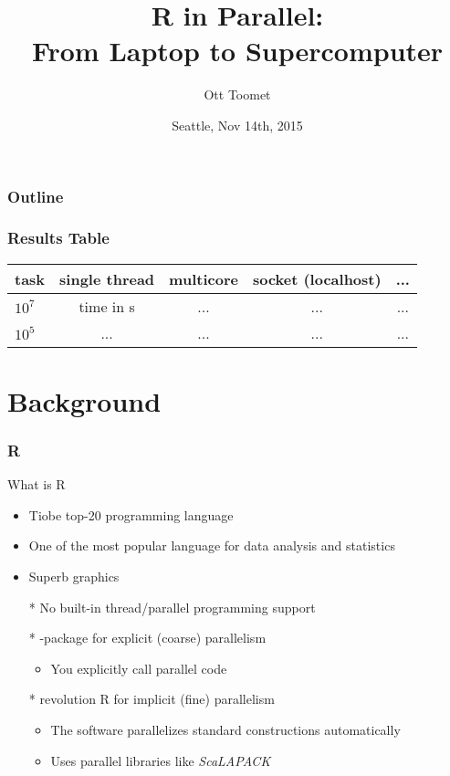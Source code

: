 \documentclass[pdftex]{beamer}
\title[parallel R]{R in Parallel:\\
  From Laptop to Supercomputer}
\author{Ott Toomet}
\date{Seattle, Nov 14th, 2015}
\newcommand{\R}{\textsf{R}\xspace}
\begin{document}
\begin{frame}
  \titlepage
\end{frame}

\begin{frame}
  \frametitle{Outline}
  \tableofcontents
\end{frame}

\begin{frame}
  \frametitle{Results Table}
  \begin{tabular}{l cccc}
    \toprule
    task      & single thread & multicore & socket (localhost) & ... \\
    \midrule
    $10^{7}$  & time in s     & ...       & ...                & ...\\
    $10^{5}$  & ...           & ...       & ...                & ...\\
    \bottomrule
  \end{tabular}
  
\end{frame}

\section{Background}

\begin{frame}
  \frametitle{\R}
  What is \R
  \begin{itemize}
  \item Tiobe top-20 programming language
  \item One of the most popular language for data analysis and statistics
  \item Superb graphics
    \pause
  \item[*] No built-in thread/parallel programming support
  \item[*] -package for explicit (coarse) parallelism
    \begin{itemize}
    \item You explicitly call parallel code
    \end{itemize}
  \item[*] revolution R for implicit (fine) parallelism
    \begin{itemize}
    \item The software parallelizes standard constructions
      automatically
    \item Uses parallel libraries like \emph{ScaLAPACK}
    \end{itemize}
  \end{itemize}
\end{frame}
\end{document}
